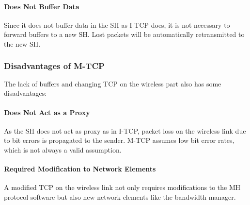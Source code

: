 \paragraph*{Does Not Buffer Data}
Since it does not buffer data in the SH as I-TCP does, it is not necessary to
forward buffers to a new SH. Lost packets will be automatically retransmitted to the new SH.

%	
%	

\subsubsection[Disadvantages]{Disadvantages of M-TCP}
The lack of buffers and changing TCP on the wireless part also has some disadvantages:

\paragraph*{Does Not Act as a Proxy}
As the SH does not act as proxy as in I-TCP, packet loss on the wireless link due to bit errors is propagated to the sender. M-TCP assumes low bit error rates, which is not always a valid assumption.

\paragraph*{Required Modification to Network Elements}
A modified TCP on the wireless link not only requires modifications to the MH protocol software but also new network elements like the
bandwidth manager.

%	

